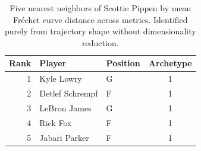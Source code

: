 \begin{table}[htbp]
  \centering\small
  \begin{tabular}{rllc}
    \toprule
    Rank & Player & Position & Archetype \\
    \midrule
    1 & Kyle Lowry & G & 1 \\
    2 & Detlef Schrempf & F & 1 \\
    3 & LeBron James & G & 1 \\
    4 & Rick Fox & F & 1 \\
    5 & Jabari Parker & F & 1 \\
    \bottomrule
  \end{tabular}
  \caption{Five nearest neighbors of Scottie Pippen by mean Fr\'{e}chet curve distance across metrics. Identified purely from trajectory shape without dimensionality reduction.}
  \label{tab:Scottie_Pippen_frechet_curve_neighbors}
\end{table}

